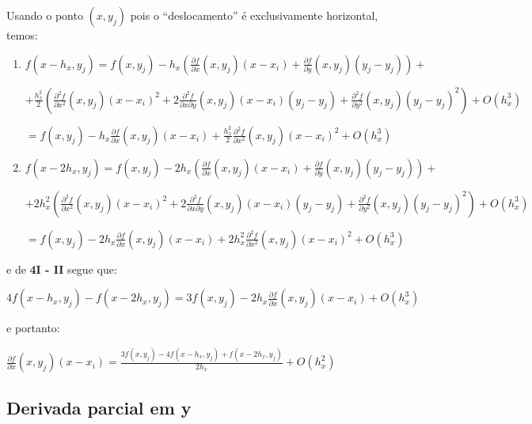 \documentclass[11pt]{article}
\begin{document}
  \indent\indent Usando o ponto $(x, y_j)$ pois o ``deslocamento'' é exclusivamente horizontal, temos:

  \begin{enumerate}[label=\textbf{\Roman*)}]
    \item $f(x - h_x, y_j) = f(x, y_j) - h_x\left(\frac{\partial f}{\partial x}\left(x, y_j \right)\left(x - x_i \right) + \frac{\partial f}{\partial y}\left(x, y_j \right)\left(y_j - y_j \right) \right) +$

    $+ \frac{h_x^2}{2}\left(\frac{\partial^2 f}{\partial x^2}\left(x, y_j\right)\left(x - x_i\right)^2 + 2\frac{\partial^2 f}{\partial x \partial y}\left(x, y_j \right)\left(x - x_i\right)\left(y_j - y_j\right) +
    \frac{\partial^2 f}{\partial y^2}\left(x, y_j\right)\left(y_j - y_j\right)^2 \right) + O(h_x^3)$

    $= f(x, y_j) - h_x\frac{\partial f}{\partial x}\left(x, y_j \right)\left(x - x_i \right) + \frac{h_x^2}{2}\frac{\partial^2 f}{\partial x^2}\left(x, y_j\right)\left(x - x_i\right)^2 + O(h_x^3)$


    \item $f(x - 2h_x, y_j) = f(x, y_j) - 2h_x\left(\frac{\partial f}{\partial x}\left(x, y_j \right)\left(x - x_i \right) + \frac{\partial f}{\partial y}\left(x, y_j \right)\left(y_j - y_j \right) \right) +$

    $+ 2h_x^2\left(\frac{\partial^2 f}{\partial x^2}\left(x, y_j\right)\left(x - x_i\right)^2 + 2\frac{\partial^2 f}{\partial x \partial y}\left(x, y_j \right)\left(x - x_i\right)\left(y_j - y_j\right) +
    \frac{\partial^2 f}{\partial y^2}\left(x, y_j\right)\left(y_j - y_j\right)^2 \right) + O(h_x^3)$

    $= f(x, y_j) - 2h_x\frac{\partial f}{\partial x}\left(x, y_j \right)\left(x - x_i \right) + 2h_x^2\frac{\partial^2 f}{\partial x^2}\left(x, y_j\right)\left(x - x_i\right)^2 + O(h_x^3)$
  \end{enumerate}

  e de \textbf{4I - II} segue que:

  $4f(x - h_x, y_j) - f(x - 2h_x, y_j) = 3f(x, y_j) - 2h_x\frac{\partial f}{\partial x}\left(x, y_j \right)\left(x - x_i \right) + O(h_x^3)$

  e portanto:

  $\frac{\partial f}{\partial x}\left(x, y_j \right)\left(x - x_i \right) = \frac{3f(x, y_j) - 4f(x - h_x, y_j) + f(x - 2h_x, y_j)}{2h_x}  + O(h_x^2)$

  \subsection{Derivada parcial em y}
\end{document}
